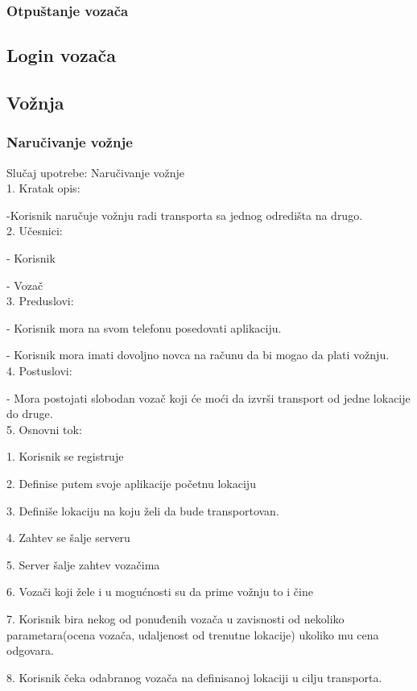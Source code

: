 \subsubsection{\bfseries Otpuštanje vozača}


\subsection{\bfseries Login vozača}

\subsection{\bfseries Vo\v znja}

\subsubsection{\bfseries Naru\v civanje vo\v znje}
\noindent Slučaj upotrebe: Naručivanje vožnje\\
1. Kratak opis:
\par -Korisnik naručuje vožnju radi transporta sa jednog odredišta na drugo. \\
2.  Učesnici:  
\par - Korisnik
\par - Vozač \\
3. Preduslovi: 
\par - Korisnik mora na svom telefonu posedovati aplikaciju.
\par - Korisnik mora imati dovoljno novca na računu da bi mogao da plati vožnju. \\
4. Postuslovi:
\par - Mora postojati slobodan vozač koji će moći da izvrši transport od jedne lokacije do druge.\\
5. Osnovni tok:
\par 1. Korisnik se registruje
\par 2.  Definise putem svoje aplikacije početnu lokaciju
\par 3. Definiše lokaciju na koju želi da bude transportovan.
\par 4. Zahtev se šalje serveru
\par 5. Server šalje zahtev vozačima
\par 6. Vozači koji žele i u mogućnosti su da prime vožnju to i čine
\par 7. Korisnik bira  nekog od ponuđenih vozača u zavisnosti od nekoliko parametara(ocena vozača, udaljenost od trenutne lokacije) ukoliko mu cena odgovara.
\par 8. Korisnik čeka odabranog vozača na definisanoj lokaciji u cilju transporta. \\

